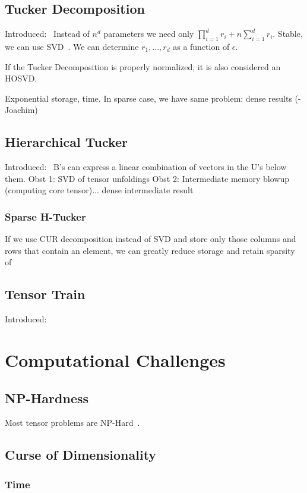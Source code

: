 \documentclass[10pt]{article}
\begin{document}
\subsection{Tucker Decomposition}
Introduced:~\cite{Tuck1966c}
Instead of $n^d$ parameters we need only $\prod_{i=1}^d r_i + n\sum_{i=1}^d r_i$.
Stable, we can use SVD~\cite{Lathauwer00amultilinear}.
We can determine $r_1, \dots, r_d$ as a function of $\epsilon$.

If the Tucker Decomposition is properly normalized, it is also considered an HOSVD.

Exponential storage, time. In sparse case, we have same problem: dense results (-Joachim)
\subsection{Hierarchical Tucker}
Introduced:~\cite{Grasedyck:2010:HSV:1958286.1958311}
B's can express a linear combination of vectors in the U's below them.
Obst 1: SVD of tensor unfoldings
Obst 2: Intermediate memory blowup (computing core tensor)... dense intermediate result
\subsubsection{Sparse H-Tucker}
If we use CUR decomposition instead of SVD and store only those columns and rows that contain an element, we can greatly reduce storage and retain sparsity of 

\subsection{Tensor Train}
Introduced:~\cite{Oseledets:2011:TD:2079141.2079149}
\section{Computational Challenges}
\subsection{NP-Hardness}
Most tensor problems are NP-Hard~\cite{Hillar}.
\subsection{Curse of Dimensionality}
\subsubsection{Time}
\end{document}
